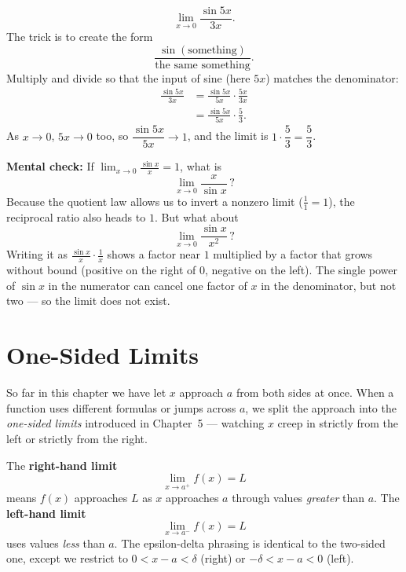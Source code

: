 \begin{example}
\label{ch07:ex-sin-build}
\[
  \lim_{x\to 0}\frac{\sin 5x}{3x}.
\]
The trick is to create the form
\[
  \frac{\sin(\text{something})}{\text{the same something}}.
\]
Multiply and divide so that the input of sine (here $5x$) matches the
denominator:
\begin{align*}
  \frac{\sin 5x}{3x}
  &= \frac{\sin 5x}{5x}\cdot\frac{5x}{3x}\\
  &= \frac{\sin 5x}{5x}\cdot\frac{5}{3}.
\end{align*}
As $x\to 0$, $5x\to 0$ too, so $\dfrac{\sin 5x}{5x}\to 1$, and the limit is
$1\cdot\dfrac53 = \dfrac53$.
\end{example}

\begin{recoverybox}
\textbf{Mental check:} If $\lim_{x\to 0}\frac{\sin x}{x} = 1$, what is
\[
  \lim_{x\to 0}\frac{x}{\sin x}\,?
\]
Because the quotient law allows us to
invert a nonzero limit ($\frac{1}{1}=1$), the reciprocal ratio also heads
to $1$. But what about
\[
  \lim_{x\to 0}\frac{\sin x}{x^2}\,?
\]
Writing
it as $\frac{\sin x}{x}\cdot\frac{1}{x}$ shows a factor near $1$ multiplied by a factor that grows
without bound (positive on the right of $0$, negative on the left). The single power of $\sin x$ in the numerator can cancel one factor
of $x$ in the denominator, but not two --- so the limit does not exist.
\end{recoverybox}

\section{One-Sided Limits}
\label{ch07:onesided}

So far in this chapter we have let $x$ approach $a$ from both sides at once. When a
function uses different formulas or jumps across $a$, we split the approach into the \emph{one-sided limits} introduced in Chapter~5 ---
watching $x$ creep in strictly from the left or strictly from the right.

\begin{definition}
\label{ch07:def-onesided}
The \textbf{right-hand limit}
\[
  \lim_{x\to a^{+}} f(x) = L
\]
means
$f(x)$ approaches $L$ as $x$ approaches $a$ through values \emph{greater} than
$a$. The \textbf{left-hand limit}
\[
  \lim_{x\to a^{-}} f(x) = L
\]
uses values \emph{less} than $a$. The epsilon-delta phrasing is identical to
the two-sided one, except we restrict to $0 < x - a < \delta$ (right) or
$-\delta < x - a < 0$ (left).
\end{definition}

